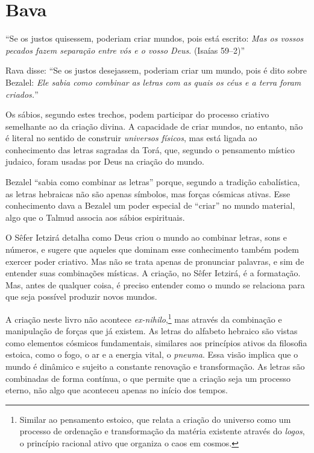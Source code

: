 \chapter*{Bava \smallskip{}}

``Se os justos quisessem, poderiam criar mundos, pois está escrito: \textit{Mas os vossos pecados fazem separação entre vós e o vosso Deus}. (Isaías 59--2)''

Rava disse: ``Se os justos desejassem, poderiam criar um mundo, pois é dito sobre Bezalel: \textit{Ele sabia como combinar as letras com as quais os céus e a terra foram criados.}''

Os sábios, segundo estes trechos, podem participar do processo criativo semelhante ao da criação divina. A capacidade de criar mundos, no entanto, não é literal no sentido de construir \textit{universos físicos}, mas está ligada ao conhecimento das letras sagradas da Torá, que, segundo o pensamento místico judaico, foram usadas por Deus na criação do mundo.

Bezalel ``sabia como combinar as letras'' porque, segundo a tradição cabalística, as letras hebraicas não são apenas símbolos, mas forças cósmicas ativas. Esse conhecimento dava a Bezalel um poder especial de ``criar'' no mundo material, algo que o Talmud associa aos sábios espirituais.

O Sêfer Ietzirá detalha como Deus criou o mundo ao combinar letras, sons e números, e sugere que aqueles que dominam esse conhecimento também podem exercer poder criativo. Mas não se trata apenas de pronunciar palavras, e sim de entender suas combinações místicas. A criação, no Sêfer Ietzirá, é a formatação. Mas, antes de qualquer coisa, é preciso entender como o mundo se relaciona para que seja possível produzir novos mundos. 

A criação neste livro não acontece \textit{ex-nihilo},\footnote{Similar ao pensamento estoico, que relata a criação do universo como um processo de ordenação e transformação da matéria existente através do \textit{logos}, o princípio racional ativo que organiza o caos em cosmos.} mas através da combinação e manipulação de forças que já existem. As letras do alfabeto hebraico são vistas como elementos cósmicos fundamentais, similares aos princípios ativos da filosofia estoica, como o fogo, o ar e a energia vital, o \textit{pneuma}. Essa visão implica que o mundo é dinâmico e sujeito a constante renovação e transformação. As letras são combinadas de forma contínua, o que permite que a criação seja um processo eterno, não algo que aconteceu apenas no início dos tempos.

